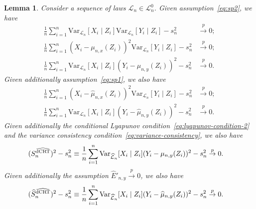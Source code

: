\documentclass[aos]{imsart}
\theoremstyle{plain}
\newtheorem{lemma}{Lemma}
\theoremstyle{remark}
\newcommand{\V}{\mathrm{Var}}							%
\newcommand{\convp}{\overset p \rightarrow}             %
\newcommand{\srx}{X}									%
\newcommand{\srz}{Z}									%
\newcommand{\sry}{Y}									%
\newcommand{\law}{\mathcal L}							%
\newcommand{\nulllaws}{\mathscr L^0}					%
\newcommand{\lawhat}{\widehat{\mathcal L}}				%
\newcommand{\dCRThat}{\widehat{\textnormal{dCRT}}}		%
\begin{document}
\begin{lemma}
	\label{lem:variance_convg}
	Consider a sequence of laws $\law_n \in \nulllaws_n$. Given assumption~\eqref{eq:sp2}, we have
	\begin{align}
		\frac{1}{n} \sum_{i=1}^n \V_{\law_n}[\srx_i\mid \srz_i]\V_{\law_n}[\sry_i \mid \srz_i] -s^2_n &\convp 0; \label{eq:variance_convg_1} \\ 
		\frac{1}{n}\sum_{i = 1}^n (\srx_i - \mu_{n,x}(\srz_i))^2\V_{\law_n}[\sry_i\mid\srz_i]-s^2_n &\convp 0; \label{eq:variance_convg_2} \\
		\frac{1}{n}\sum_{i = 1}^n \V_{\law_n}[\srx_i\mid\srz_i](\sry_i - \mu_{n,y}(\srz_i))^2-s^2_n &\convp 0. \label{eq:variance_convg_3}
	\end{align}
	Given additionally assumption~\eqref{eq:sp1}, we also have
	\begin{align}
		\frac{1}{n} \sum_{i = 1}^n (\srx_i - \widehat \mu_{n,x}(\srz_i))^2\V_{\law_n}[\sry_i\mid\srz_i] - s^2_n &\convp 0; \label{eq:variance_convg_4} \\
		\frac{1}{n}\sum_{i = 1}^n \V_{\law_n}[\srx_i\mid\srz_i](\sry_i - \widehat \mu_{n,y}(\srz_i))^2-s^2_n &\convp 0. \label{eq:variance_convg_5}
	\end{align}
	Given additionally the conditional Lyapunov condition~\eqref{eq:lyapunov-condition-2} and the variance consistency condition~\eqref{eq:variance-consistency}, we also have
	\begin{align}
		(S^{\dCRThat}_n)^2 - s_n^2 \equiv \frac{1}{n}\sum_{i = 1}^n \V_{\lawhat_n}[\srx_i\mid\srz_i](\sry_i - \mu_{n,y}(\srz_i))^2-s^2_n &\convp 0. \label{eq:variance_convg_6}
	\end{align}
	Given additionally the assumption $\widehat E'_{n,y} \convp 0$, we also have
	\begin{align}
		(\widehat S^{\dCRThat}_n)^2 - s_n^2 \equiv \frac{1}{n}\sum_{i = 1}^n \V_{\lawhat_n}[\srx_i\mid\srz_i](\sry_i - \widehat \mu_{n,y}(\srz_i))^2-s^2_n &\convp 0. \label{eq:variance_convg_7}
	\end{align}
	
\end{lemma}
\end{document}
